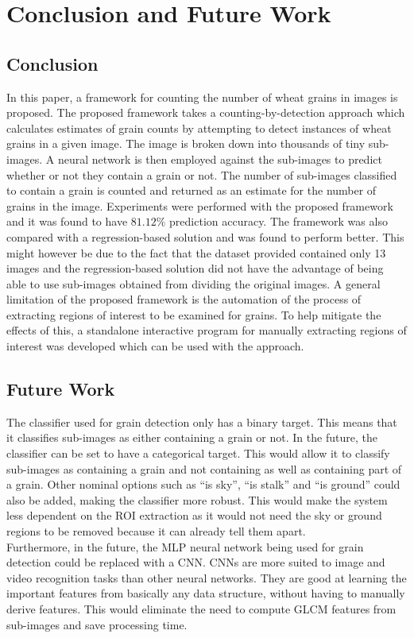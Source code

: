 \def\baselinestretch{1}

\chapter{Conclusion and Future Work}
\section{Conclusion}
In this paper, a framework for counting the number of wheat grains in images is proposed. The proposed framework takes a counting-by-detection approach which calculates estimates of grain counts by attempting to detect instances of wheat grains in a given image. The image is broken down into thousands of tiny sub-images. A neural network is then employed against the sub-images to predict whether or not they contain a grain or not. The number of sub-images classified to contain a grain is counted and returned as an estimate for the number of grains in the image. Experiments were performed with the proposed framework and it was found to have $81.12\%$ prediction accuracy. The framework was also compared with a regression-based solution and was found to perform better. This might however be due to the fact that the dataset provided contained only 13 images and the regression-based solution did not have the advantage of being able to use sub-images obtained from dividing the original images. A general limitation of the proposed framework is the automation of the process of extracting regions of interest to be examined for grains. To help mitigate the effects of this, a standalone interactive program for manually extracting regions of interest was developed which can be used with the approach.  

\section{Future Work}
The classifier used for grain detection only has a binary target. This means that it classifies sub-images as either containing a grain or not. In the future, the classifier can be set to have a categorical target. This would allow it to classify sub-images as containing a grain and not containing as well as containing part of a grain. Other nominal options such as ``is sky'', ``is stalk'' and ``is ground'' could also be added, making the classifier more robust. This would make the system less dependent on the ROI extraction as it would not need the sky or ground regions to be removed because it can already tell them apart.\\ 
%
Furthermore, in the future, the MLP neural network being used for grain detection could be replaced with a CNN. CNNs are more suited to image and video recognition tasks than other neural networks. They are good at learning the important features from basically any data structure, without having to manually derive features. This would eliminate the need to compute GLCM features from sub-images and save processing time.

\def\baselinestretch{1.66}





